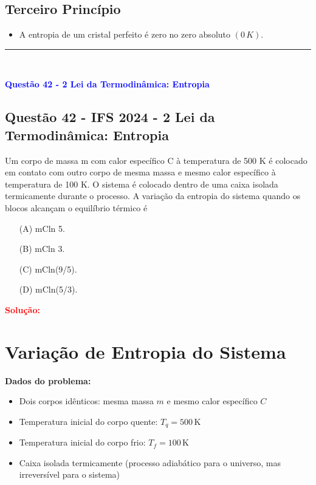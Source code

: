 \subsection*{Terceiro Princípio}
\begin{itemize}
    \item A entropia de um cristal perfeito é zero no zero absoluto $(0\,K)$.
\end{itemize}

\noindent\rule{\linewidth}{0.6pt}\\

\begin{flushleft}
\textbf{\textcolor{blue}{\Large Quest\~ao  42 - 2 Lei da Termodinâmica: Entropia}}\\
\noindent
\subsection{Quest\~ao 42 - IFS 2024 - 2 Lei da Termodinâmica: Entropia}
Um corpo de massa m com calor específico C à temperatura
de 500 K é colocado em contato com outro corpo de mesma
massa e mesmo calor específico à temperatura de 100 K. O
sistema é colocado dentro de uma caixa isolada
termicamente durante o processo. A variação da entropia do
sistema quando os blocos alcançam o equilíbrio térmico é

\begin{itemize}
\item[(A)] mCln 5.
\item[(B)] mCln 3.
\item[(C)] mCln(9/5).
\item[(D)] mCln(5/3).
\end{itemize}

\vspace{0.5cm}

\textcolor{red}{\textbf{Solução:}}\\

\section*{Variação de Entropia do Sistema}

\textbf{Dados do problema:}
\begin{itemize}
    \item Dois corpos idênticos: mesma massa \(m\) e mesmo calor específico \(C\)
    \item Temperatura inicial do corpo quente: \(T_q = 500\,\mathrm{K}\)
    \item Temperatura inicial do corpo frio: \(T_f = 100\,\mathrm{K}\)
    \item Caixa isolada termicamente (processo adiabático para o universo, mas irreversível para o sistema)
\end{itemize}


\end{flushleft}
